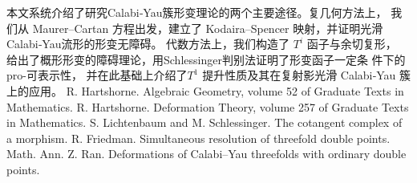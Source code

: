 \assignReq
{}
{}
{}
{}
{}
\assignWork
{本文系统介绍了研究Calabi‑Yau簇形变理论的两个主要途径。复几何方法上，}
{我们从 Maurer–Cartan 方程出发，建立了 Kodaira–Spencer 映射，并证明光滑 }
{Calabi‑Yau流形的形变无障碍。
代数方法上，我们构造了 \(T^i\) 函子与余切复形，
}
{
给出了概形形变的障碍理论，用Schlessinger判别法证明了形变函子一定条}
{件下的pro-可表示性，
并在此基础上介绍了\(T^1\) 提升性质及其在复射影光滑 }
{Calabi‑Yau 簇上的应用。}
\assignRef
{R. Hartshorne. Algebraic Geometry, volume 52 of Graduate Texts in Mathematics.}
{R. Hartshorne. Deformation Theory, volume 257 of Graduate Texts in Mathematics.}
{S. Lichtenbaum and M. Schlessinger. The cotangent complex of a morphism.}
{R. Friedman. Simultaneous resolution of threefold double points. Math. Ann.}
{Z. Ran. Deformations of Calabi–Yau threefolds with ordinary double points.}
{}
{}
{}
